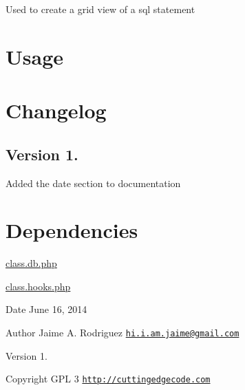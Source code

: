 Used to create a grid view of a sql statement\hypertarget{nav1_usage}{}\section{Usage}\label{nav1_usage}

\hypertarget{nav1_changelog}{}\section{Changelog}\label{nav1_changelog}
\subsection*{Version 1.}


\begin{DoxyItemize}
\item Added the date section to documentation
\end{DoxyItemize}\hypertarget{ip2country_dependencies}{}\section{Dependencies}\label{ip2country_dependencies}

\begin{DoxyItemize}
\item \hyperlink{class_8db_8php}{class.\-db.\-php}
\item \hyperlink{class_8hooks_8php}{class.\-hooks.\-php}
\end{DoxyItemize}

\begin{DoxyDate}{Date}
June 16, 2014 
\end{DoxyDate}
\begin{DoxyAuthor}{Author}
Jaime A. Rodriguez \href{mailto:hi.i.am.jaime@gmail.com}{\tt hi.\-i.\-am.\-jaime@gmail.\-com} 
\end{DoxyAuthor}
\begin{DoxyVersion}{Version}
1. 
\end{DoxyVersion}
\begin{DoxyCopyright}{Copyright}
G\-P\-L 3 \href{http://cuttingedgecode.com}{\tt http\-://cuttingedgecode.\-com} 
\end{DoxyCopyright}
